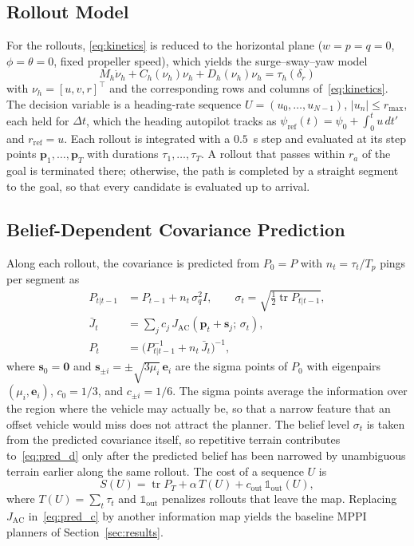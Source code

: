 \documentclass[letterpaper, 10 pt, journal, twoside]{IEEEtran}
\DeclareMathOperator{\tr}{tr}
\newcommand{\bp}{\mathbf{p}}
\newcommand{\bs}{\mathbf{s}}
\newcommand{\JA}{J_{\mathrm{AC}}}
\begin{document}
\subsection{Rollout Model}
For the rollouts, \eqref{eq:kinetics} is reduced to the horizontal plane ($w = p = q = 0$, $\phi = \theta = 0$, fixed propeller speed), which yields the surge--sway--yaw model
\begin{equation}
  M_h\dot{\nu}_h + C_h(\nu_h)\nu_h + D_h(\nu_h)\nu_h = \tau_h(\delta_r)
  \label{eq:horizontal}
\end{equation}
with $\nu_h = [u, v, r]^\top$ and the corresponding rows and columns of~\eqref{eq:kinetics}. The decision variable is a heading-rate sequence $U = (u_0, \ldots, u_{N-1})$, $|u_n| \le r_{\max}$, each held for $\Delta t$, which the heading autopilot tracks as $\psi_{\mathrm{ref}}(t) = \psi_0 + \int_0^t u\,dt'$ and $r_{\mathrm{ref}} = u$. Each rollout is integrated with a $0.5$~s step and evaluated at its step points $\bp_1, \ldots, \bp_T$ with durations $\tau_1, \ldots, \tau_T$. A rollout that passes within $r_a$ of the goal is terminated there; otherwise, the path is completed by a straight segment to the goal, so that every candidate is evaluated up to arrival.

\subsection{Belief-Dependent Covariance Prediction}
Along each rollout, the covariance is predicted from $P_0 = P$ with $n_t = \tau_t / T_p$ pings per segment as
\begin{subequations}\label{eq:prediction}
\begin{align}
  P_{t|t-1} &= P_{t-1} + n_t\,\sigma_q^2 I, \qquad \sigma_t = \sqrt{\tfrac{1}{2}\tr P_{t|t-1}}, \label{eq:pred_a} \\
  \bar{J}_t &= \textstyle\sum_{j} c_j\, \JA(\bp_t + \bs_j;\, \sigma_t), \label{eq:pred_c} \\
  P_t &= \big( P_{t|t-1}^{-1} + n_t\,\bar{J}_t \big)^{-1}, \label{eq:pred_d}
\end{align}
\end{subequations}
where $\bs_0 = \mathbf{0}$ and $\bs_{\pm i} = \pm\sqrt{3\mu_i}\,\mathbf{e}_i$ are the sigma points of $P_0$ with eigenpairs $(\mu_i, \mathbf{e}_i)$, $c_0 = 1/3$, and $c_{\pm i} = 1/6$. The sigma points average the information over the region where the vehicle may actually be, so that a narrow feature that an offset vehicle would miss does not attract the planner. The belief level $\sigma_t$ is taken from the predicted covariance itself, so repetitive terrain contributes to~\eqref{eq:pred_d} only after the predicted belief has been narrowed by unambiguous terrain earlier along the same rollout. The cost of a sequence $U$ is
\begin{equation}
  S(U) = \tr P_T + \alpha\, T(U) + c_{\mathrm{out}}\,\mathbb{1}_{\mathrm{out}}(U),
  \label{eq:cost}
\end{equation}
where $T(U) = \sum_t \tau_t$ and $\mathbb{1}_{\mathrm{out}}$ penalizes rollouts that leave the map. Replacing $\JA$ in~\eqref{eq:pred_c} by another information map yields the baseline MPPI planners of Section~\ref{sec:results}.
\end{document}
